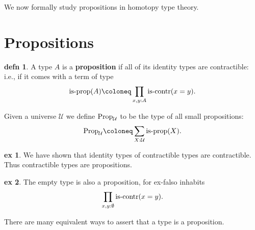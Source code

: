 \documentclass{amsart}
\theoremstyle{theorem}
\theoremstyle{definition}
\newtheorem*{defn}{defn}
\newtheorem*{ex}{ex}
\theoremstyle{remark}
\newcommand{\0}{\mathbbe{0}}
\newcommand{\1}{\mathbbe{1}}
\newcommand{\2}{\mathbbe{2}}
\newcommand{\3}{\mathbbe{3}}
\newcommand{\4}{\mathbbe{4}}
\newcommand{\type}[1]{{\textup{#1}}}
\newcommand{\UU}{{\mathcal{U}}}
\newcommand{\is}[1]{\type{is-{#1}}}
\newcommand{\iscontr}{\type{is-contr}}
\newcommand{\isprop}{\type{is-prop}}
\newcommand{\Prop}{\type{Prop}_{\UU}}
\begin{document}
We now formally study propositions in homotopy type theory.

\section*{Propositions}

\begin{defn} A type $A$ is a \textbf{proposition} if all of its identity types are contractible: i.e., if it comes with a term of type
\[ \is{prop}(A) \coloneq \prod_{x,y:A} \is{contr}(x=y).\]
\end{defn}

Given a universe $\UU$ we define $\Prop$ to be the type of all small propositions:
\[ \Prop \coloneq \sum_{X: \UU}\isprop(X).\]

\begin{ex} We have shown that identity types of contractible types are contractible. Thus contractible types are propositions.
\end{ex}

\begin{ex} The empty type is also a proposition, for ex-falso inhabits
\[ \prod_{x,y: \emptyset} \iscontr(x=y).\]
\end{ex}

There are many equivalent ways to assert that a type is a proposition.
\end{document}
